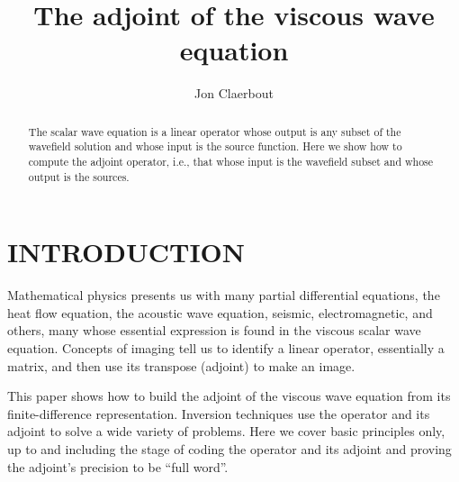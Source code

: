 \title{The adjoint of the viscous wave equation}
\author{Jon Claerbout}

\def\figdir{./Fig}


\def\eq{\quad =\quad}
\def\pluseq{\quad +=\quad}
\def\CAKEDIR{.}


\begin{abstract}
The scalar wave equation is a linear operator whose output is any
subset of the wavefield solution and whose input is the source
function.  Here we show how to compute the adjoint operator, i.e.,
that whose input is the wavefield subset and whose output is the
sources.
\end{abstract}


\section{INTRODUCTION}

Mathematical physics presents us with many partial differential equations,
the heat flow equation, the acoustic wave equation, seismic, electromagnetic, and others,
many whose essential expression is found in the viscous scalar wave equation.
Concepts of imaging tell us
to identify a linear operator, essentially a matrix,
and then use its transpose (adjoint) to make an image.
\par
This paper shows how
to build the adjoint of the viscous wave equation
from its finite-difference representation.
Inversion techniques use the operator and its adjoint
to solve a wide variety of problems.
Here we cover basic principles only,
up to and including the stage of coding the operator and its adjoint
and proving the adjoint's precision to be ``full word''.


